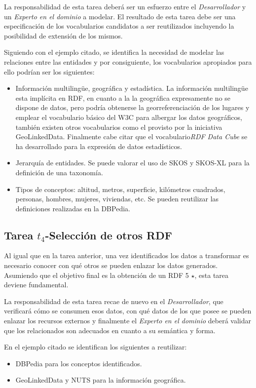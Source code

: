 La responsabilidad de esta tarea deberá ser un esfuerzo entre el \textit{Desarrollador} y un \textit{Experto en el dominio} a 
modelar. El resultado de esta tarea debe ser una especificación de los vocabularios candidatos
a ser reutilizados incluyendo la posibilidad de extensión de los mismos.

Siguiendo con el ejemplo citado, se identifica la necesidad de modelar las relaciones entre las entidades y por consiguiente, los vocabularios
apropiados para ello podrían ser los siguientes:
\begin{itemize}
 \item Información multiling\"{u}e, geográfica y estadística. La información multiling\"{u}e esta implícita
en \gls{RDF}, en cuanto a la la geográfica expresamente no se dispone de datos, pero podría obtenerse la georreferenciación de los
lugares y emplear el vocabulario básico del \gls{W3C} para albergar los datos geográficos, también existen otros vocabularios como el provisto por la iniciativa 
GeoLinkedData. Finalmente cabe citar que el vocabulario\textit{RDF Data Cube} se ha desarrollado para la expresión de datos estadísticos.
 \item Jerarquía de entidades. Se puede valorar el uso de \gls{SKOS} y \gls{SKOS-XL} para la definición de una taxonomía.
 \item Tipos de conceptos: altitud, metros, superficie, kilómetros cuadrados, personas, hombres, mujeres, viviendas, etc. Se pueden reutilizar
las definiciones realizadas en la DBPedia.
\end{itemize}


\subsection{Tarea $t_4$-Selección de otros \datasets RDF}
Al igual que en la tarea anterior, una vez identificados los datos a transformar 
es necesario conocer con qué otros \datasets se pueden enlazar los datos generados. Asumiendo que 
el objetivo final es la obtención de un \dataset \gls{RDF} 5 $\star$, esta tarea deviene fundamental.

La responsabilidad de esta tarea recae de nuevo en el \textit{Desarrollador}, que verificará cómo se
consumen esos datos, con qué datos de los que posee se pueden enlazar los recursos externos y finalmente
el \textit{Experto en el dominio} deberá validar que los \datasets relacionados son adecuados en cuanto a su semántica
y forma.

En el ejemplo citado se identifican los siguientes \datasets a reutilizar:
\begin{itemize}
 \item DBPedia para los conceptos identificados.
 \item GeoLinkedData y \gls{NUTS} para la información geográfica.
\end{itemize}


